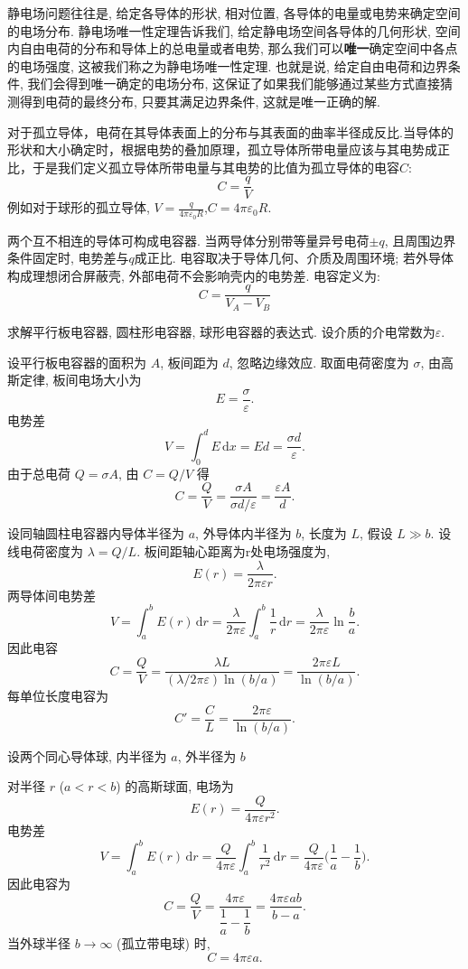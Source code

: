 静电场问题往往是, 给定各导体的形状, 相对位置, 各导体的电量或电势来确定空间的电场分布. 静电场唯一性定理告诉我们, 给定静电场空间各导体的几何形状, 空间内自由电荷的分布和导体上的总电量或者电势, 那么我们可以\textbf{唯一}确定空间中各点的电场强度, 这被我们称之为静电场唯一性定理. 也就是说, 给定自由电荷和边界条件, 我们会得到唯一确定的电场分布, 这保证了如果我们能够通过某些方式直接猜测得到电荷的最终分布, 只要其满足边界条件, 这就是唯一正确的解.

对于孤立导体，电荷在其导体表面上的分布与其表面的曲率半径成反比.当导体的形状和大小确定时，根据电势的叠加原理，孤立导体所带电量应该与其电势成正比，于是我们定义孤立导体所带电量与其电势的比值为孤立导体的电容$C$:
\[
C=\frac{q}{V}
\]
例如对于球形的孤立导体, $V=\frac{q}{4\pi\varepsilon_0R}$,$C=4\pi\varepsilon_0R$.

两个互不相连的导体可构成电容器. 当两导体分别带等量异号电荷$\pm q$, 且周围边界条件固定时, 电势差与$q$成正比. 电容取决于导体几何、介质及周围环境; 若外导体构成理想闭合屏蔽壳, 外部电荷不会影响壳内的电势差. 电容定义为:
\[
C=\frac{q}{V_A-V_B}
\]

\begin{example}
求解平行板电容器, 圆柱形电容器, 球形电容器的表达式. 设介质的介电常数为$\varepsilon$.

设平行板电容器的面积为 $A$, 板间距为 $d$, 忽略边缘效应.
  取面电荷密度为 $\sigma$, 由高斯定律, 板间电场大小为
  \[
    E=\frac{\sigma}{\varepsilon}.
  \]
  电势差
  \[
    V=\int_0^d E\,\mathrm{d}x=E d=\frac{\sigma d}{\varepsilon}.
  \]
  由于总电荷 $Q=\sigma A$, 由 $C=Q/V$ 得
  \[
    C=\frac{Q}{V}=\frac{\sigma A}{\sigma d/\varepsilon}=\frac{\varepsilon A}{d}.
  \]

  设同轴圆柱电容器内导体半径为 $a$, 外导体内半径为 $b$, 长度为 $L$, 假设 $L\gg b$. 设线电荷密度为 $\lambda=Q/L$. 板间距轴心距离为r处电场强度为,
  \[
    E(r)=\frac{\lambda}{2\pi\varepsilon r}.
  \]
  两导体间电势差
  \[
    V=\int_a^b E(r)\,\mathrm{d}r=\frac{\lambda}{2\pi\varepsilon}\int_a^b\frac{1}{r}\,\mathrm{d}r
    =\frac{\lambda}{2\pi\varepsilon}\ln\frac{b}{a}.
  \]
  因此电容
  \[
    C=\frac{Q}{V}=\frac{\lambda L}{(\lambda/2\pi\varepsilon)\ln(b/a)}=\frac{2\pi\varepsilon L}{\ln(b/a)}.
  \]
  每单位长度电容为
  \[
    C'=\frac{C}{L}=\frac{2\pi\varepsilon}{\ln(b/a)}.
  \]

  设两个同心导体球, 内半径为 $a$, 外半径为 $b$

  对半径 $r$ ($a<r<b$) 的高斯球面, 电场为
  \[
    E(r)=\frac{Q}{4\pi\varepsilon r^2}.
  \]
  电势差
  \[
    V=\int_a^b E(r)\,\mathrm{d}r=\frac{Q}{4\pi\varepsilon}\int_a^b\frac{1}{r^2}\,\mathrm{d}r
    =\frac{Q}{4\pi\varepsilon}\Big(\frac{1}{a}-\frac{1}{b}\Big).
  \]
  因此电容为
  \[
    C=\frac{Q}{V}=\frac{4\pi\varepsilon}{\dfrac{1}{a}-\dfrac{1}{b}}=\frac{4\pi\varepsilon ab}{\,b-a\,}.
  \]
  当外球半径 $b\to\infty$ (孤立带电球) 时,
  \[
    C=4\pi\varepsilon a.
  \]
\end{example}

